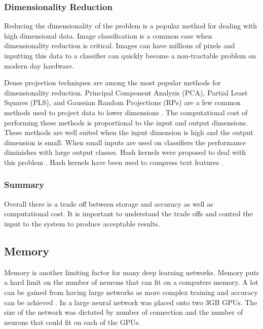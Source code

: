 \documentclass[font=12pt]{article}
\begin{document}
\subsubsection{Dimensionality Reduction}
Reducing the dimensionality of the problem is a popular method for dealing with high dimensional data. Image classification is a common case when dimensionality reduction is critical. Images can have millions of pixels and inputting this data to a classifier can quickly become a non-tractable problem on modern day hardware.

Dense projection techniques are among the most popular methods for dimensionality reduction. Principal Component Analysis (PCA), Partial Least Squares (PLS), and Gaussian Random Projections (RPs) are a few common methods used to project data to lower dimensions \cite{sanchez2011high}. The computational cost of performing these methods is proportional to the input and output dimensions. These methods are well suited when the input dimension is high and the output dimension is small. When small inputs are used on classifiers the performance diminishes with large output classes. Hash kernels were proposed to deal with this problem \cite{shi2009hash,weinberger2009feature}. Hash kernels have been used to compress text features \cite{shi2009hash,weinberger2009feature}.

\subsubsection{Summary}
Overall there is a trade off between storage and accuracy as well as computational cost. It is important to understand the trade offs and control the input to the system to produce acceptable results.

\subsection{Memory}
Memory is another limiting factor for many deep learning networks. Memory puts a hard limit on the number of neurons that can fit on a computers memory. A lot can be gained from having large networks as more complex training and accuracy can be achieved \cite{krizhevsky2012imagenet}. In \cite{krizhevsky2012imagenet} a large neural network was placed onto two 3GB GPUs. The size of the network was dictated by number of connection and the number of neurons that could fit on each of the GPUs. 
\end{document}
